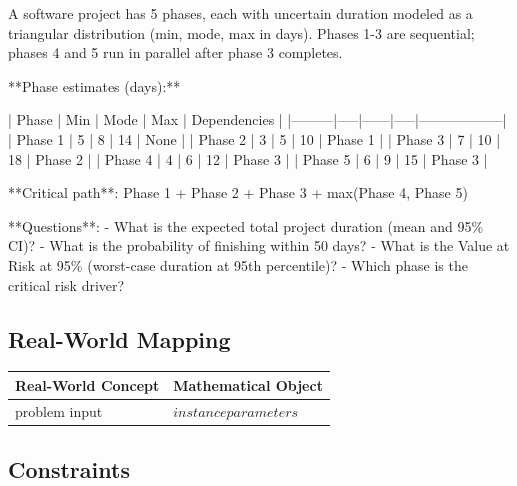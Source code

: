 \documentclass[11pt, a4paper]{article}
\begin{document}
A software project has 5 phases, each with uncertain duration modeled as a triangular distribution (min, mode, max in days). Phases 1-3 are sequential; phases 4 and 5 run in parallel after phase 3 completes.

**Phase estimates (days):**

| Phase   | Min | Mode | Max | Dependencies     |
|---------|-----|------|-----|------------------|
| Phase 1 |  5  |   8  |  14 | None             |
| Phase 2 |  3  |   5  |  10 | Phase 1          |
| Phase 3 |  7  |  10  |  18 | Phase 2          |
| Phase 4 |  4  |   6  |  12 | Phase 3          |
| Phase 5 |  6  |   9  |  15 | Phase 3          |

**Critical path**: Phase 1 + Phase 2 + Phase 3 + max(Phase 4, Phase 5)

**Questions**:
- What is the expected total project duration (mean and 95\% CI)?
- What is the probability of finishing within 50 days?
- What is the Value at Risk at 95\% (worst-case duration at 95th percentile)?
- Which phase is the critical risk driver?

\subsection{Real-World Mapping}

\begin{longtable}{ll}
\toprule
\textbf{Real-World Concept} & \textbf{Mathematical Object} \\
\midrule
\endhead
problem input & $instance parameters$ \\
\bottomrule
\end{longtable}

\subsection{Constraints}
\end{document}
